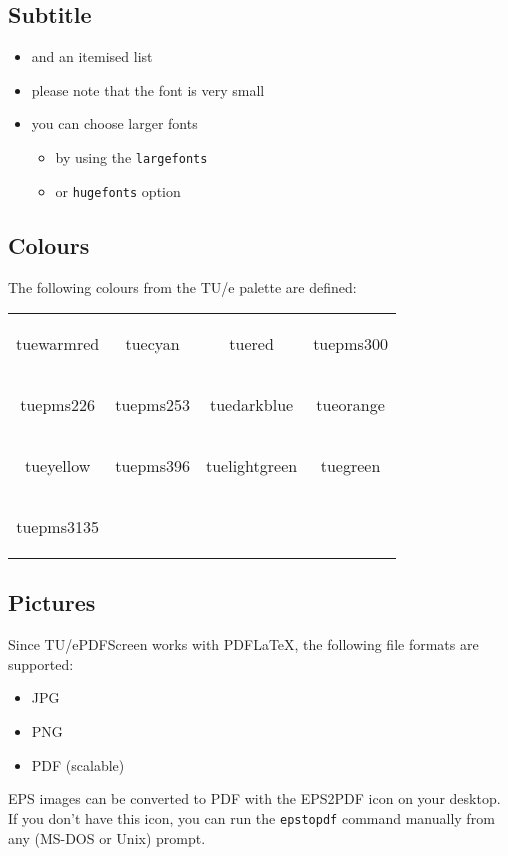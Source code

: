 \documentclass[a4paper]{article}            %
\begin{document}
\begin{slidetop}
\section*{Subtitle}

\begin{itemize}
\item and an itemised list
\item please note that the font is very small
\item you can choose larger fonts
\begin{itemize}
\item by using the \verb|largefonts|
\item or \verb|hugefonts| option
\end{itemize}
\end{itemize}
\end{slidetop}

\begin{slidetop}
\section*{Colours}

The following colours from the TU/e palette are defined:

\bigskip
\newcommand{\cb}[1]{\colorbox{#1}{\parbox[b][1cm][c]{3.2cm}{#1}}}
\setlength{\fboxsep}{2mm}
\begin{tabular}{cccc}
\cb{tuewarmred} & \cb{tuecyan}  & \cb{tuered}  & \cb{tuepms300} \\[5mm]
\cb{tuepms226} & \cb{tuepms253}  & \colorbox{tuedarkblue}{\parbox[b][1cm][c]{3.2cm}{\color{white}tuedarkblue}}  & \cb{tueorange} \\[5mm]
\cb{tueyellow} & \cb{tuepms396}  & \cb{tuelightgreen}  & \cb{tuegreen} \\[5mm]
\cb{tuepms3135} & && \\
\end{tabular}
\end{slidetop}

\begin{slidetop}
\section*{Pictures}

Since TU/ePDFScreen works with PDF\LaTeX, the following file formats are supported:
\begin{itemize}
\item JPG
\item PNG
\item PDF (scalable)
\end{itemize}

EPS images can be converted to PDF with the EPS2PDF icon on your desktop. If you don't have this icon, you can run the \verb|epstopdf| command manually from any (MS-DOS or Unix) prompt.
\end{slidetop}
\end{document}
